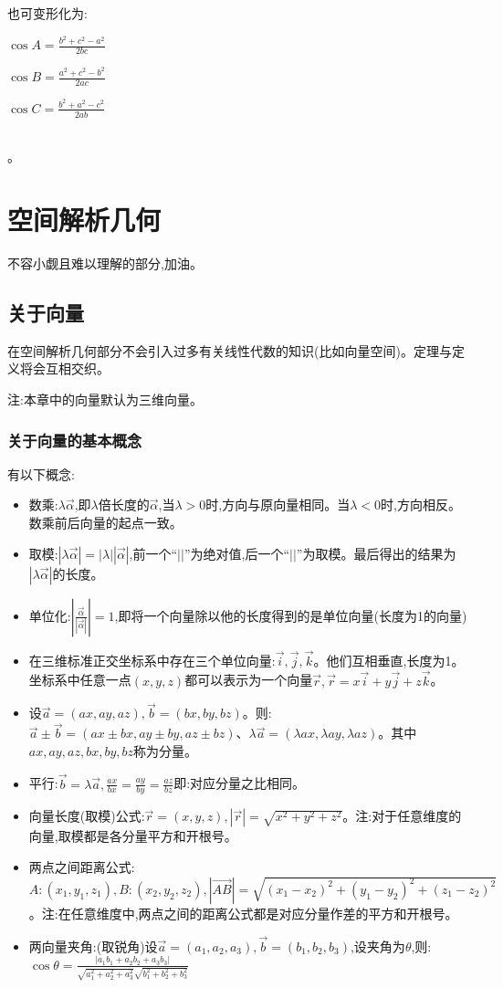 \documentclass[UTF8]{ctexbook}
\begin{document}
{{{  也可变形化为:

  $\cos A = \frac{b^2 + c^2 - a^2}{2bc}$

  $\cos B = \frac{a^2 + c^2 - b^2}{2ac}$

  $\cos C = \frac{b^2 + a^2 - c^2}{2ab}$
}%
\\

。

}%

\section{空间解析几何}{
  不容小觑且难以理解的部分,加油。

  \subsection{关于向量}{
    在空间解析几何部分不会引入过多有关线性代数的知识(比如向量空间)。定理与定义将会互相交织。

    注:本章中的向量默认为三维向量。

    \subsubsection{关于向量的基本概念}{
      有以下概念:
      \begin{itemize}
        \item 数乘:$\lambda \vec{\alpha}$,即$\lambda$倍长度的$\vec{\alpha}$,当$\lambda > 0$时,方向与原向量相同。当$\lambda < 0$时,方向相反。数乘前后向量的起点一致。
        \item 取模:$|\lambda\vec{\alpha}| = |\lambda||\vec{\alpha}|$,前一个“$||$”为绝对值,后一个“$||$”为取模。最后得出的结果为$|\lambda\vec{\alpha}|$的长度。
        \item 单位化:$|\frac{\vec{\alpha}}{|\vec{\alpha}|}| = 1$,即将一个向量除以他的长度得到的是单位向量(长度为1的向量)
        \item 在三维标准正交坐标系中存在三个单位向量:$\vec{i},\vec{j},\vec{k}$。他们互相垂直,长度为1。坐标系中任意一点$(x,y,z)$都可以表示为一个向量$\vec{r},\vec{r} = x\vec{i} + y\vec{j} + z\vec{k}$。
        \item 设$\vec{a} = (ax,ay,az),\vec{b} = (bx,by,bz)$。则:$\vec{a} \pm \vec{b} = (ax \pm bx,ay \pm by,az \pm bz)$、$\lambda\vec{a} = (\lambda ax,\lambda ay,\lambda az)$。其中$ax,ay,az,bx,by,bz$称为分量。
        \item 平行:$\vec{b} = \lambda\vec{a},\frac{ax}{bx} = \frac{ay}{by} = \frac{az}{bz}$即:对应分量之比相同。
        \item 向量长度(取模)公式:$\vec{r} = (x,y,z),|\vec{r}| = \sqrt{x^2 + y^2 + z^2}$。注:对于任意维度的向量,取模都是各分量平方和开根号。
        \item 两点之间距离公式:$A:(x_1,y_1,z_1),B:(x_2,y_2,z_2),|\vec{AB}| = \sqrt{(x_1 - x_2)^2 + (y_1 -y_2)^2 + (z_1 - z_2)^2}$。注:在任意维度中,两点之间的距离公式都是对应分量作差的平方和开根号。
        \item {
              两向量夹角:(取锐角)设$\vec{a} = (a_1, a_2, a_3),\vec{b} = (b_1,b_2,b_3)$,设夹角为$\theta$,则:$\cos\theta = \frac{|a_1b_1 + a_2b_2 + a_3b_3|}{\sqrt{a_1^2 + a_2^2 + a_3^2}\sqrt{b_1^2 + b_2^2 + b_3^2}}$

}
\end{itemize}}}}}
\end{document}
